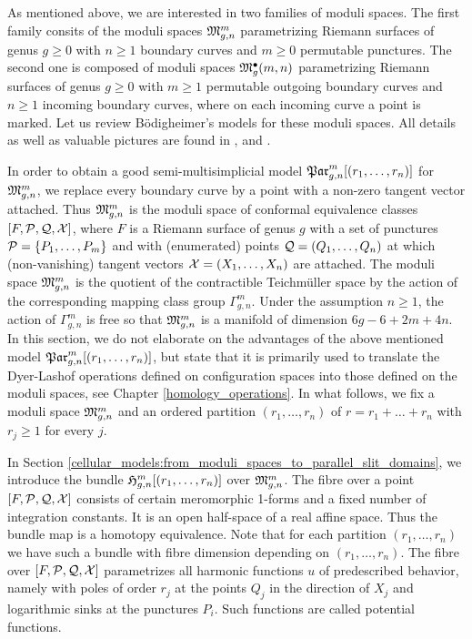 As mentioned above, we are interested in two families of moduli spaces.
The first family consits of the moduli spaces $\mathfrak{M}^m_{g,n}$ parametrizing
Riemann surfaces of genus $g \ge 0$ with $n \ge 1$ boundary curves and $m \ge 0$ permutable punctures.
The second one is composed of moduli spaces $\mathfrak{M}^\bullet_g(m, n)$ parametrizing Riemann surfaces of genus $g \ge 0$ with $m \ge 1$ permutable outgoing boundary curves and
$n \ge 1$ incoming boundary curves, where on each incoming curve a point is marked.
Let us review Bödigheimer's models for these moduli spaces.
All details as well as valuable pictures are found in \cite{Boedigheimer19901}, \cite{Boedigheimer19902} and \cite{Boedigheimer2006}.

In order to obtain a good semi-multisimplicial model $\Parr$ for $\mathfrak{M}^m_{g,n}$, we replace every boundary curve by a point with a non-zero tangent vector attached.
Thus $\mathfrak{M}^m_{g,n}$ is the moduli space of conformal equivalence classes $[F, \mathcal{P}, \mathcal{Q}, \mathcal{X}]$, where
$F$ is a Riemann surface of genus $g$ with a set of punctures $\mc P = \{ P_1, \ldots, P_m \}$ and with (enumerated) points $\mc Q = ( Q_1, \ldots, Q_n )$ at which (non-vanishing) tangent vectors $\mc X = ( X_1, \ldots, X_n )$ are attached.
The moduli space $\mathfrak{M}^m_{g,n}$ is the quotient of the contractible Teichmüller space by the action of the corresponding mapping class group $\Gamma_{g,n}^m$.
Under the assumption $n \ge 1$, the action of $\Gamma_{g,n}^m$ is free so that $\mathfrak{M}^m_{g,n}$ is a manifold of dimension $6g - 6 + 2m + 4n$.
In this section, we do not elaborate on the advantages of the above mentioned model $\Parr$,
but state that it is primarily used to translate the Dyer-Lashof operations defined on configuration spaces into those defined on the moduli spaces,
see Chapter \ref{homology_operations}.
In what follows, we fix a moduli space $\mathfrak{M}^m_{g,n}$ and an ordered partition $(r_1, \ldots, r_n)$ of $r = r_1 + \ldots + r_n$ with $r_j \ge 1$ for every $j$.

In Section \ref{cellular_models:from_moduli_spaces_to_parallel_slit_domains}, we introduce the bundle $\Harmr$ over $\mathfrak{M}^m_{g,n}$.
The fibre over a point $[F, \mathcal{P}, \mathcal{Q}, \mathcal{X}]$ consists of certain meromorphic 1-forms and a fixed number of integration constants.
It is an open half-space of a real affine space.
Thus the bundle map is a homotopy equivalence. Note that for each partition $(r_1, \ldots, r_n)$ we have such a bundle with fibre dimension depending on $(r_1, \ldots, r_n)$.
The fibre over $[F, \mathcal{P}, \mathcal{Q}, \mathcal{X}]$ parametrizes all harmonic functions $u$ of predescribed behavior, namely with poles of order $r_j$ at
the points $Q_j$ in the direction of $X_j$ and logarithmic sinks at the punctures $P_i$.
Such functions are called potential functions.

